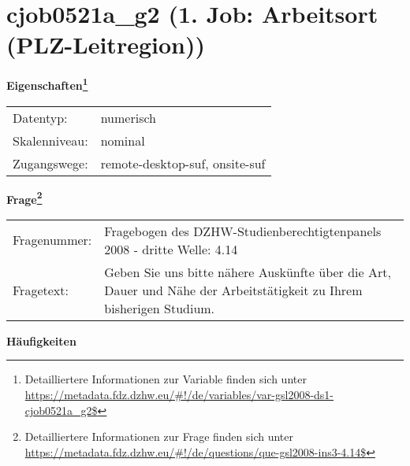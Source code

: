 
    \setcounter{footnote}{0}

    \vspace*{-1.8cm}
	\section{cjob0521a\_g2 (1. Job: Arbeitsort (PLZ-Leitregion))}
	\label{section:cjob0521a_g2}



    \vspace*{0.5cm}
    \noindent\textbf{Eigenschaften\footnote{Detailliertere Informationen zur Variable finden sich unter
		\url{https://metadata.fdz.dzhw.eu/\#!/de/variables/var-gsl2008-ds1-cjob0521a_g2$}}}\\
	\begin{tabularx}{\hsize}{@{}lX}
	Datentyp: & numerisch \\
	Skalenniveau: & nominal \\
	Zugangswege: &
	  remote-desktop-suf, 
	  onsite-suf
 \\
    \end{tabularx}



				\vspace*{0.5cm}
                \noindent\textbf{Frage\footnote{Detailliertere Informationen zur Frage finden sich unter
		              \url{https://metadata.fdz.dzhw.eu/\#!/de/questions/que-gsl2008-ins3-4.14$}}}\\
				\begin{tabularx}{\hsize}{@{}lX}
					Fragenummer: &
					  Fragebogen des DZHW-Studienberechtigtenpanels 2008 - dritte Welle:
					  4.14
 \\
					Fragetext: & Geben Sie uns bitte nähere Auskünfte über die Art, Dauer und Nähe der Arbeitstätigkeit zu Ihrem bisherigen Studium. \\
				\end{tabularx}





        		\vspace*{0.5cm}
                \noindent\textbf{Häufigkeiten}

